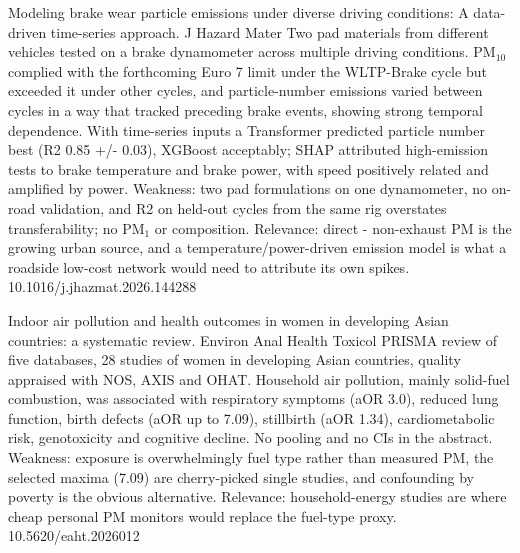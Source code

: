 \documentclass[10pt]{article}
\begin{document}
{Modeling brake wear particle emissions under diverse driving conditions: A data-driven time-series approach.}
{J Hazard Mater}
{Two pad materials from different vehicles tested on a brake dynamometer across multiple driving conditions. PM$_{10}$ complied with the forthcoming Euro 7 limit under the WLTP-Brake cycle but exceeded it under other cycles, and particle-number emissions varied between cycles in a way that tracked preceding brake events, showing strong temporal dependence. With time-series inputs a Transformer predicted particle number best (R2 0.85 +/- 0.03), XGBoost acceptably; SHAP attributed high-emission tests to brake temperature and brake power, with speed positively related and amplified by power. Weakness: two pad formulations on one dynamometer, no on-road validation, and R2 on held-out cycles from the same rig overstates transferability; no PM$_{1}$ or composition. Relevance: direct - non-exhaust PM is the growing urban source, and a temperature/power-driven emission model is what a roadside low-cost network would need to attribute its own spikes.}
{10.1016/j.jhazmat.2026.144288}

\par{}\baselineskip{}\baselineskip
{}

{Indoor air pollution and health outcomes in women in developing Asian countries: a systematic review.}
{Environ Anal Health Toxicol}
{PRISMA review of five databases, 28 studies of women in developing Asian countries, quality appraised with NOS, AXIS and OHAT. Household air pollution, mainly solid-fuel combustion, was associated with respiratory symptoms (aOR 3.0), reduced lung function, birth defects (aOR up to 7.09), stillbirth (aOR 1.34), cardiometabolic risk, genotoxicity and cognitive decline. No pooling and no CIs in the abstract. Weakness: exposure is overwhelmingly fuel type rather than measured PM, the selected maxima (7.09) are cherry-picked single studies, and confounding by poverty is the obvious alternative. Relevance: household-energy studies are where cheap personal PM monitors would replace the fuel-type proxy.}
{10.5620/eaht.2026012}
\end{document}
